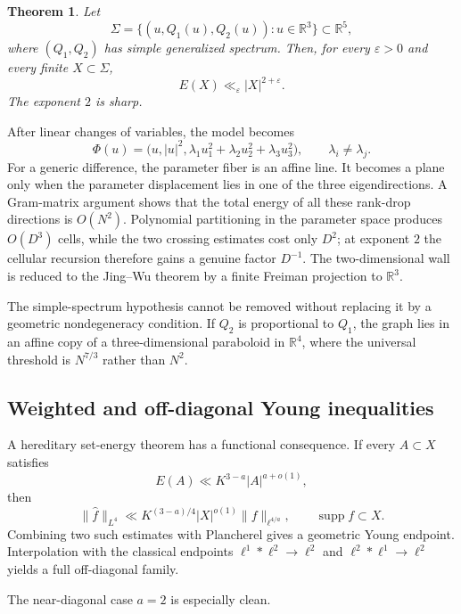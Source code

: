 \documentclass[11pt]{amsart}
\numberwithin{equation}{section}
\newtheorem{theorem}{Theorem}[section]
\theoremstyle{definition}
\theoremstyle{remark}
\newcommand{\R}{\mathbb R}
\newcommand{\supp}{\operatorname{supp}}
\newcommand{\eps}{\varepsilon}
\newcommand{\1}{\mathbf 1}
\newcommand{\card}[1]{\lvert #1\rvert}
\newcommand{\norm}[2][]{\lVert #2\rVert_{#1}}
\begin{document}
\begin{theorem}\label{thm:quadratic-threefold-intro}
Let
\[
 \Sigma=\{(u,Q_1(u),Q_2(u)):u\in\R^3\}\subset\R^5,
\]
where $(Q_1,Q_2)$ has simple generalized spectrum.  Then, for every $\eps>0$ and every finite $X\subset\Sigma$,
\begin{equation}\label{eq:quadratic-threefold-intro}
 E(X)\ll_\eps \card X^{2+\eps}.
\end{equation}
The exponent $2$ is sharp.
\end{theorem}

After linear changes of variables, the model becomes
\[
 \Phi(u)=\bigl(u,|u|^2,\lambda_1u_1^2+\lambda_2u_2^2+\lambda_3u_3^2\bigr),
 \qquad \lambda_i\neq\lambda_j.
\]
For a generic difference, the parameter fiber is an affine line.  It becomes a plane only when the parameter displacement lies in one of the three eigendirections.  A Gram-matrix argument shows that the total energy of all these rank-drop directions is $O(N^2)$.  Polynomial partitioning in the parameter space produces $O(D^3)$ cells, while the two crossing estimates cost only $D^2$; at exponent $2$ the cellular recursion therefore gains a genuine factor $D^{-1}$.  The two-dimensional wall is reduced to the Jing--Wu theorem by a finite Freiman projection to $\R^3$.

The simple-spectrum hypothesis cannot be removed without replacing it by a geometric nondegeneracy condition.  If $Q_2$ is proportional to $Q_1$, the graph lies in an affine copy of a three-dimensional paraboloid in $\R^4$, where the universal threshold is $N^{7/3}$ rather than $N^2$.

\subsection{Weighted and off-diagonal Young inequalities}
A hereditary set-energy theorem has a functional consequence.  If every $A\subset X$ satisfies
\[
 E(A)\ll K^{3-a}\card A^{a+o(1)},
\]
then
\begin{equation}\label{eq:weighted-intro}
 \norm[L^4]{\widehat f}
 \ll K^{(3-a)/4}\card X^{o(1)}\norm[\ell^{4/a}]{f},
 \qquad \supp f\subset X.
\end{equation}
Combining two such estimates with Plancherel gives a geometric Young endpoint.  Interpolation with the classical endpoints $\ell^1*\ell^2\to\ell^2$ and $\ell^2*\ell^1\to\ell^2$ yields a full off-diagonal family.

The near-diagonal case $a=2$ is especially clean.
\end{document}
